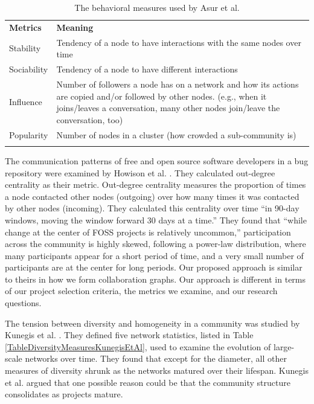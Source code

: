 \documentclass[12pt]{report}
\begin{document}
\begin{table}[!htbp]
\caption{The behavioral measures used by Asur et al. \cite{Asur}}
\label{tableDiversityMeasuresAsurEtAl} 
\begin{tabular}{p{} p{}}
\hline\noalign{\smallskip}
\textbf{Metrics} & \textbf{Meaning} \\
\noalign{\smallskip}\hline\noalign{\smallskip}
Stability & Tendency of a node to have interactions with the same nodes over time \\ \hline
Sociability & Tendency of a node to have different interactions \\\hline
Influence & Number of followers a node has on a network and how its actions are copied and/or followed by other nodes. (e.g., when it joins/leaves a conversation, many other nodes join/leave the conversation, too) \\\hline
Popularity & Number of nodes in a cluster (how crowded a sub-community is) \\
\noalign{\smallskip}\hline
\end{tabular}
\end{table}

The communication patterns of free and open source software developers in a bug repository were examined by Howison et al. \cite{HowisonSocialDynamics}. They calculated out-degree centrality as their metric. Out-degree centrality measures the proportion of times a node contacted other nodes (outgoing) over how many times it was contacted by other nodes (incoming). They calculated this centrality over time ``in 90-day windows, moving the window forward 30 days at a time.'' They found that ``while change at the center of FOSS projects is relatively uncommon,'' participation across the community is highly skewed, following a power-law distribution, where many participants appear for a short period of time, and a very small number of participants are at the center for long periods. Our proposed approach is similar to theirs in how we form collaboration graphs. Our approach is different in terms of our project selection criteria, the metrics we examine, and our research questions.

The tension between diversity and homogeneity in a community was studied by Kunegis et al. \cite{Kunegis}. They defined five network statistics, listed in Table \ref{TableDiversityMeasuresKunegisEtAl}, used to examine the evolution of large-scale networks over time. They found that except for the diameter, all other measures of diversity shrunk as the networks matured over their lifespan. Kunegis et al. \cite{Kunegis} argued that one possible reason could be that the community structure consolidates as projects mature.
\end{document}
